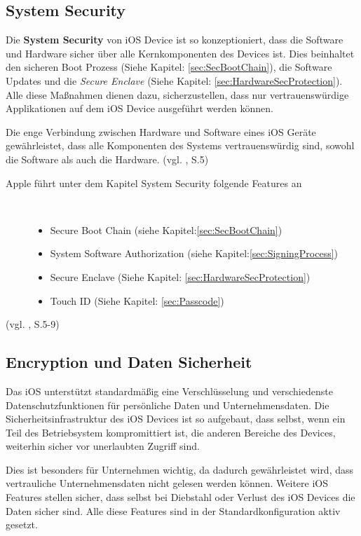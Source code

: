 \subsection{System Security}
\label{sec:SystemSec}
Die \textbf{System Security} von iOS Device ist so kon­zep­ti­o­nie­rt, dass die Software und Hardware sicher über alle Kernkomponenten des Devices ist. Dies beinhaltet den sicheren Boot Prozess (Siehe Kapitel: \ref{sec:SecBootChain}), die Software Updates und die \textit{\glqq Secure Enclave \grqq{}} (Siehe Kapitel: \ref{sec:HardwareSecProtection}). Alle diese Maßnahmen dienen dazu, sicherzustellen, dass nur vertrauenswürdige Applikationen auf dem iOS Device ausgeführt werden können.\par 

Die enge Verbindung zwischen Hardware und Software eines iOS Geräte gewährleistet, dass alle Komponenten des Systems vertrauenswürdig sind, sowohl die Software als auch die Hardware. (vgl. \cite{Apple[4]}, S.5)
\begin{description}
\item[Apple führt unter dem Kapitel System Security folgende Features an]~\par
	\begin{itemize}
		\item Secure Boot Chain (siehe Kapitel:\ref{sec:SecBootChain})
 		\item System Software Authorization (siehe Kapitel:\ref{sec:SigningProcess})
 		\item Secure Enclave (Siehe Kapitel: \ref{sec:HardwareSecProtection})
 		\item Touch ID (Siehe Kapitel: \ref{sec:Passcode})
        \end{itemize}
\end{description}
(vgl. \cite{Apple[4]}, S.5-9)

\subsection{Encryption und Daten Sicherheit}
\label{sec:DataEnc}

Das iOS unterstützt standardmäßig eine Verschlüsselung und verschiedenste Datenschutzfunktionen für persönliche Daten und Unternehmensdaten. Die Sicherheitsinfrastruktur des iOS Devices ist so aufgebaut, dass selbst, wenn ein Teil des Betriebsystem kompromittiert ist, die anderen Bereiche des Devices, weiterhin sicher vor unerlaubten Zugriff sind. \par
Dies ist besonders für Unternehmen wichtig, da dadurch gewährleistet wird, dass vertrauliche Unternehmensdaten nicht gelesen werden können. Weitere iOS Features stellen sicher, dass selbst bei Diebstahl oder Verlust des iOS Devices die Daten sicher sind. Alle diese Features sind in der Standardkonfiguration aktiv gesetzt.


